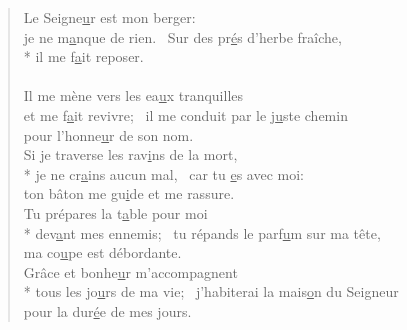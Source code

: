 
\begin{verse}
Le Seigne\underline{u}r est mon berger: \\
je ne m\underline{a}nque de rien.~\psalmstar
\vspace{-10pt}Sur des pr\underline{é}s d’herbe fraîche, \\*
il me f\underline{a}it reposer. \\
~\\
Il me mène vers les ea\underline{u}x tranquilles \\
\vspace{-10pt}et me f\underline{a}it revivre;~\psalmstar
il me conduit par le j\underline{u}ste chemin \\
pour l’honne\underline{u}r de son nom. \\

Si je traverse les rav\underline{i}ns de la mort, \\*
je ne cr\underline{a}ins aucun mal,~\psalmstar
car tu \underline{e}s avec moi: \\
ton bâton me gu\underline{i}de et me rassure. \\

Tu prépares la t\underline{a}ble pour moi \\*
dev\underline{a}nt mes ennemis;~\psalmstar
tu répands le parf\underline{u}m sur ma tête, \\
ma co\underline{u}pe est débordante. \\

Grâce et bonhe\underline{u}r m’accompagnent \\*
tous les jo\underline{u}rs de ma vie;~\psalmstar
j’habiterai la mais\underline{o}n du Seigneur \\
pour la dur\underline{é}e de mes jours. \\
\end{verse}

